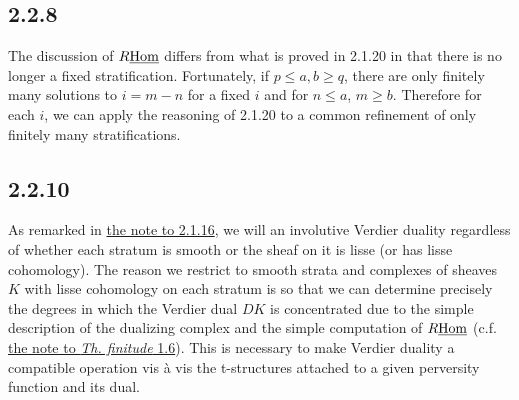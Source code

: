 \documentclass[deligne.tex]{subfiles}
\begin{document}
	\subsection*{2.2.8} The discussion of $R\underline{\operatorname{Hom}}$ differs from what
	is proved in 2.1.20 in that there is no longer a fixed stratification.
	Fortunately, if $p\leq a,b\geq q$, there are only finitely many solutions
	to $i=m-n$ for a fixed $i$ and for $n\leq a$, $m\geq b$. Therefore for
	each $i$, we can apply the reasoning of 2.1.20 to a common refinement
	of only finitely many stratifications.
	
\subsection*{2.2.10}\label{BBD:2.2.10}
As remarked in \hyperref[BBD:2.1.16]{the note to 2.1.16}, we will an
involutive Verdier duality regardless of whether each stratum is smooth
or the sheaf on it is lisse (or has lisse cohomology).
The reason we restrict to smooth strata and complexes of sheaves $K$ with
lisse cohomology on each stratum is so that we can determine precisely the
degrees in which the Verdier dual $DK$ is concentrated due to the simple
description of the dualizing complex and the simple computation of
$R\underline{\operatorname{Hom}}$
(c.f. \hyperref[thfin:1.6]{the note to \emph{Th. finitude} 1.6}).
This is necessary to make Verdier duality a compatible operation vis à vis
the t-structures attached to a given perversity function and its dual.
\end{document}
